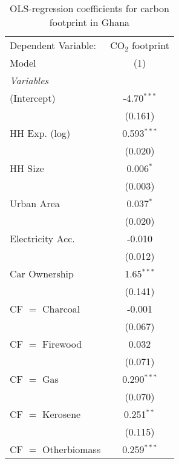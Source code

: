 
\begin{table}[htbp!]
   \centering
   \small
   \begin{adjustbox}{width = 1\textwidth, max height = 0.95\textheight, center}
      \begin{threeparttable}[b]
         \caption{\label{tab:OLS_2_GHA} OLS-regression coefficients for carbon footprint in Ghana}
         \begin{tabular}{lc}
            \tabularnewline \midrule \midrule
            Dependent Variable: & CO$_{2}$ footprint\\  
            Model               & (1)\\  
            \midrule
            \emph{Variables}\\
            (Intercept)         & -4.70$^{***}$\\   
                                & (0.161)\\   
            HH Exp. (log)       & 0.593$^{***}$\\   
                                & (0.020)\\   
            HH Size             & 0.006$^{*}$\\   
                                & (0.003)\\   
            Urban Area          & 0.037$^{*}$\\   
                                & (0.020)\\   
            Electricity Acc.    & -0.010\\   
                                & (0.012)\\   
            Car Ownership       & 1.65$^{***}$\\   
                                & (0.141)\\   
            CF $=$ Charcoal     & -0.001\\   
                                & (0.067)\\   
            CF $=$ Firewood     & 0.032\\   
                                & (0.071)\\   
            CF $=$ Gas          & 0.290$^{***}$\\   
                                & (0.070)\\   
            CF $=$ Kerosene     & 0.251$^{**}$\\   
                                & (0.115)\\   
            CF $=$ Otherbiomass & 0.259$^{***}$\\   

\end{tabular}
\end{threeparttable}
\end{adjustbox}
\end{table}
